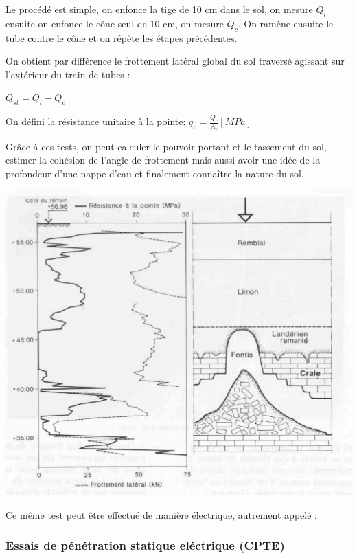             Le procédé est simple, on enfonce la tige de 10 cm dans le sol, on mesure $Q_t$ ensuite on enfonce le cône seul de 10 cm, on mesure $Q_c$. On ramène ensuite le tube contre le cône et on répète les étapes précédentes.
            
            On obtient par différence le frottement latéral global du sol traversé agissant sur l'extérieur du train de tubes : 
            
            \begin{center}
                $Q_{st} = Q_t - Q_c$ 
            \end{center}
            
            On défini la résistance unitaire à la pointe: $q_c = \frac{Q_c}{A_c} [MPa]$
            
            Grâce à ces tests, on peut calculer le pouvoir portant et le tassement du sol, estimer la cohésion de l'angle de frottement mais aussi avoir une idée de la profondeur d'une nappe d'eau et finalement connaître la nature du sol. 
            
            \includegraphics[scale=1]{Holeyman/images/H17.PNG}
            
            Ce même test peut être effectué de manière électrique, autrement appelé :
            
        \subsubsection{Essais de pénétration statique eléctrique (CPTE)}
        
